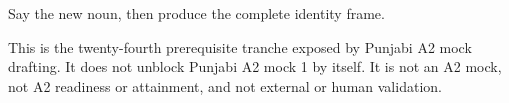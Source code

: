 \begin{tcolorbox}[breakable,colback=teal!4,colframe=teal!35!black,title={Before you move on}]
Say the new noun, then produce the complete identity frame.

This is the twenty-fourth prerequisite tranche exposed by Punjabi A2 mock drafting. It does not unblock Punjabi A2 mock 1 by itself. It is not an A2 mock, not A2 readiness or attainment, and not external or human validation.
\end{tcolorbox}

